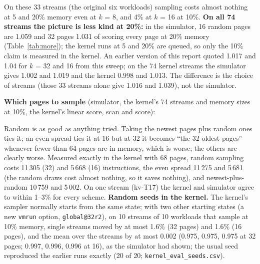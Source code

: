 \documentclass[10.5pt,a4paper]{article}
\newcommand{\code}[1]{\texttt{#1}}
\begin{document}
\begin{table}[h]
\centering\small
\resizebox{0.8\linewidth}{!}{}
\caption{Faults with $k$ sampled pages divided by faults with all pages (simulator). First three columns: score only; last three: scan and score (the kernel's way). The three seeds differ by under 0.002.}
\label{tab:sweep}
\end{table}

On these 33 streams (the original six workloads) sampling costs almost nothing at 5 and 20\% memory even at $k$ = 8, and 4\% at $k$ = 16 at 10\%. \textbf{On all 74 streams the picture is less kind at 20\%:} in the simulator, 16 random pages are 1.059 and 32 pages 1.031 of scoring every page at 20\% memory (Table~\ref{tab:more}); the kernel runs at 5 and 20\% are queued, so only the 10\% claim is measured in the kernel. An earlier version of this report quoted 1.017 and 1.04 for $k$ = 32 and 16 from this sweep;
on the 74 kernel streams the simulator gives 1.002 and 1.019 and the kernel 0.998 and 1.013. The difference is the choice of streams (those 33 streams alone give 1.016 and 1.039), not the simulator.

\textbf{Which pages to sample} (simulator, the kernel's 74 streams and memory sizes at 10\%, the kernel's linear score, scan and score):

\begin{center}\small
\resizebox{\linewidth}{!}{}
\end{center}

Random is as good as anything tried. Taking the newest pages plus random ones ties it; an even spread ties it at 16 but at 32 it becomes ``the 32 oldest pages'' whenever fewer than 64 pages are in memory, which is worse;
the others are clearly worse. Measured exactly in the kernel with 68 pages, random sampling costs 11\,305 (32) and 5\,668 (16) instructions, the even spread 11\,275 and 5\,681 (the random draws cost almost nothing, so it saves nothing),
and newest-plus-random 10\,759 and 5\,002. On one stream (kv-T17) the kernel and simulator agree to within 1--3\% for every scheme.
\textbf{Random seeds in the kernel.} The kernel's sampler normally starts from the same state; with two other starting states (a new \code{vmrun} option, \code{global@32r2}), on 10 streams of 10 workloads that sample at 10\% memory, single streams moved by at most 1.6\% (32 pages) and 1.6\% (16 pages), and the mean over the streams by at most 0.002 (0.975, 0.975, 0.975 at 32 pages; 0.997, 0.996, 0.996 at 16), as the simulator had shown; the usual seed reproduced the earlier runs exactly (20 of 20; \code{kernel\_eval\_seeds.csv}).
\end{document}
